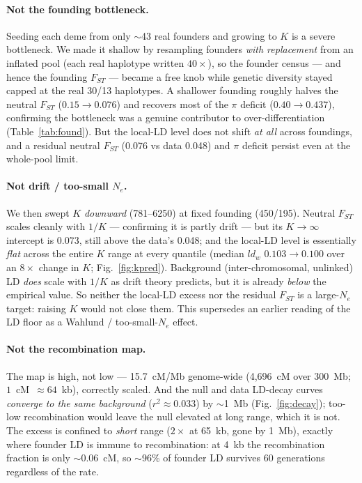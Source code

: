\documentclass[11pt,a4paper]{article}
\begin{document}
\paragraph{Not the founding bottleneck.} Seeding each deme from only $\sim$43 real
founders and growing to $K$ is a severe bottleneck. We made it shallow by resampling
founders \emph{with replacement} from an inflated pool (each real haplotype written
$40\times$), so the founder census --- and hence the founding $F_{ST}$ --- became a
free knob while genetic diversity stayed capped at the real 30/13 haplotypes.
A shallower founding roughly halves the neutral $F_{ST}$ ($0.15\to0.076$) and recovers
most of the $\pi$ deficit ($0.40\to0.437$), confirming the bottleneck was a genuine
contributor to over-differentiation (Table~\ref{tab:found}). But the local-LD level
does not shift \emph{at all} across foundings, and a residual neutral $F_{ST}$ (0.076
vs data 0.048) and $\pi$ deficit persist even at the whole-pool limit.

\paragraph{Not drift / too-small $N_e$.} We then swept $K$ \emph{downward}
(781--6250) at fixed founding (450/195). Neutral $F_{ST}$ scales cleanly with $1/K$
--- confirming it is partly drift --- but its $K\to\infty$ intercept is 0.073, still
above the data's 0.048; and the local-LD level is essentially \emph{flat} across the
entire $K$ range at every quantile (median $ld_w$ $0.103\to0.100$ over an $8\times$
change in $K$; Fig.~\ref{fig:kpred}). Background (inter-chromosomal, unlinked) LD
\emph{does} scale with $1/K$ as drift theory predicts, but it is already \emph{below}
the empirical value. So neither the local-LD excess nor the residual $F_{ST}$ is a
large-$N_e$ target: raising $K$ would not close them. This supersedes an earlier
reading of the LD floor as a Wahlund / too-small-$N_e$ effect.

\paragraph{Not the recombination map.} The map is high, not low --- 15.7~cM/Mb
genome-wide (4{,}696~cM over 300~Mb; $1$~cM~$\approx64$~kb), correctly scaled. And the
null and data LD-decay curves \emph{converge to the same background} ($r^2\approx0.033$)
by $\sim$1~Mb (Fig.~\ref{fig:decay}); too-low recombination would leave the null
elevated at long range, which it is not. The excess is confined to \emph{short} range
($2\times$ at 65~kb, gone by 1~Mb), exactly where founder LD is immune to
recombination: at 4~kb the recombination fraction is only $\sim$0.06~cM, so $\sim$96\%
of founder LD survives 60 generations regardless of the rate.
\end{document}
